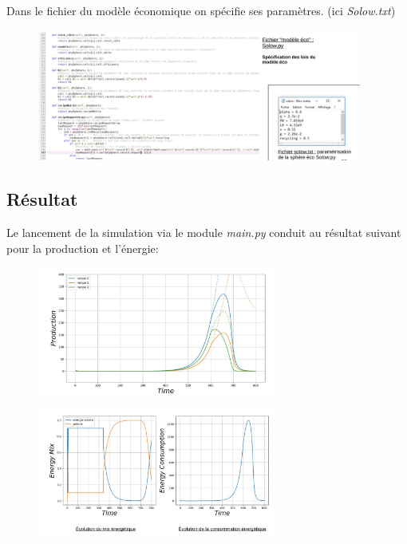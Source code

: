 \documentclass[12pt,a4paper]{article}%
\begin{document}
Dans le fichier du modèle économique on spécifie ses paramètres. (ici \textit{Solow.txt})

\begin{figure}[h]
\centering\includegraphics[width=0.95\textwidth]{figures/Parametrisation3.jpg}
\end{figure}

\subsection{Résultat}

Le lancement de la simulation via le module \textit{main.py} conduit au résultat
suivant pour la production et l'énergie:

\begin{figure}[h]
\centering\includegraphics[width=0.7\textwidth]{figures/ResultatSimul.jpg}
\end{figure}

\begin{figure}[h]
\centering\includegraphics[width=0.7\textwidth]{figures/ResultatSimulE.jpg}
\end{figure}
\end{document}

